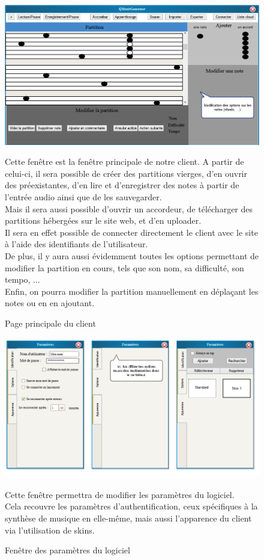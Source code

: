 
\begin{figure}[H]

	\centering 
	\includegraphics[scale=0.4]{main_page}
		\caption{Page principale du client}
			Cette fenêtre est la fenêtre principale de notre client. A partir de celui-ci, il sera possible
			de créer des partitions vierges, d'en ouvrir des préexistantes, d'en lire et d'enregistrer des 
			notes à partir de l'entrée audio ainsi que de les sauvegarder. \\
			Mais il sera aussi possible d'ouvrir un accordeur, de télécharger des partitions hébergées sur le
			site web, et d'en uploader. \\
			Il sera en effet possible de connecter directement le client avec le site à l'aide des 
			identifiants de l'utilisateur. \\
			De plus, il y aura aussi évidemment toutes les options permettant de modifier la partition en 
			cours, tels que son nom, sa difficulté, son tempo, ... \\
			Enfin, on pourra modifier la partition manuellement en déplaçant les notes ou en en ajoutant. 

\end{figure}

\begin{figure}[H]

	\centering 
	\includegraphics[scale=0.4]{parameters}
		\caption{Fenêtre des paramètres du logiciel}
			Cette fenêtre permettra de modifier les paramètres du logiciel. \\
			Cela recouvre les paramètres d'authentification, ceux spécifiques à la synthèse de musique en
			elle-même, mais aussi l'apparence du client via l'utilisation de skins.

\end{figure}

